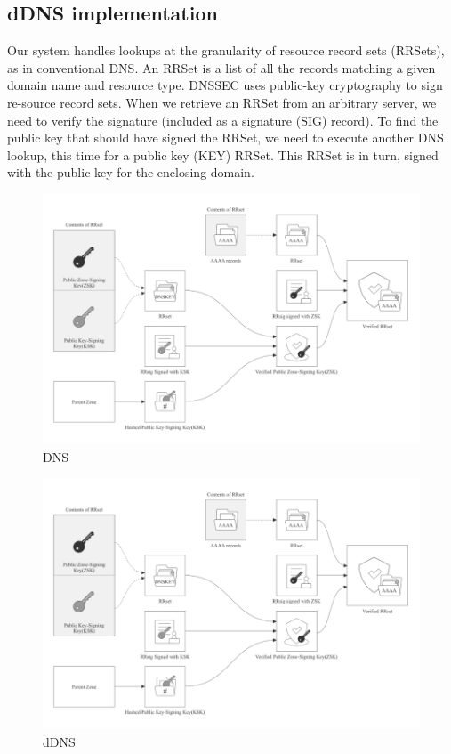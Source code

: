 \documentclass[twocolumn]{article}
\begin{document}
\subsection{dDNS implementation}
Our system handles lookups at the granularity of resource record sets (RRSets), as in conventional DNS. An RRSet is a list of all the records matching a given domain name and resource type.
DNSSEC uses public-key cryptography to sign re-source record sets. When we retrieve an RRSet from an arbitrary server, we need to verify the signature (included as a signature (SIG) record). To find the public key that should have signed the RRSet, we need to execute another DNS lookup, this time for a public key (KEY) RRSet. This RRSet is in turn, signed with the public key for the enclosing domain.
\begin{figure}[H]
  \includegraphics[width=\linewidth]{imgs/2.png}
    \caption{DNS}
\end{figure}
\begin{figure}[htbp]
  \includegraphics[width=\linewidth]{imgs/4.png}
  \caption{dDNS}
  \label{ddns}

  \end{figure}
\end{document}
